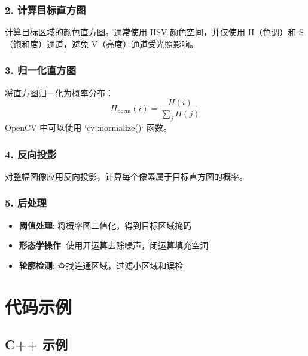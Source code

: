 \documentclass{article}
\begin{document}
\subsubsection{2. 计算目标直方图}
计算目标区域的颜色直方图。通常使用 HSV 颜色空间，并仅使用 H（色调）和 S（饱和度）通道，避免 V（亮度）通道受光照影响。

\subsubsection{3. 归一化直方图}
将直方图归一化为概率分布：
\[
H_{\text{norm}}(i) = \frac{H(i)}{\sum_j H(j)}
\]
OpenCV 中可以使用 `cv::normalize()` 函数。

\subsubsection{4. 反向投影}
对整幅图像应用反向投影，计算每个像素属于目标直方图的概率。

\subsubsection{5. 后处理}
\begin{itemize}
    \item \textbf{阈值处理}: 将概率图二值化，得到目标区域掩码
    \item \textbf{形态学操作}: 使用开运算去除噪声，闭运算填充空洞
    \item \textbf{轮廓检测}: 查找连通区域，过滤小区域和误检
\end{itemize}

\section{代码示例}

\subsection{C++ 示例}
\end{document}
